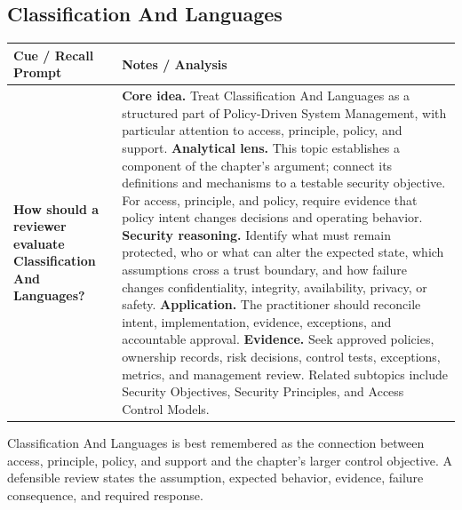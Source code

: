 \documentclass[11pt]{article}
\newcommand{\CornellHeader}{%
\rowcolor{Navy}\color{white}\bfseries Cue / Recall Prompt & \color{white}\bfseries Notes / Analysis\\\hline}
\newcommand{\CornellRow}[2]{%
\cellcolor{CueGray}\RaggedRight\textbf{#1} & \RaggedRight #2\\\hline}
\begin{document}
\subsection*{Classification And Languages}
\begin{longtable}{>{\RaggedRight\arraybackslash}p{}|>{\RaggedRight\arraybackslash}p{}}
\CornellHeader
\CornellRow{How should a reviewer evaluate Classification And Languages?}{\textbf{Core idea.} Treat Classification And Languages as a structured part of Policy-Driven System Management, with particular attention to access, principle, policy, and support. \textbf{Analytical lens.} This topic establishes a component of the chapter's argument; connect its definitions and mechanisms to a testable security objective. For access, principle, and policy, require evidence that policy intent changes decisions and operating behavior. \textbf{Security reasoning.} Identify what must remain protected, who or what can alter the expected state, which assumptions cross a trust boundary, and how failure changes confidentiality, integrity, availability, privacy, or safety. \textbf{Application.} The practitioner should reconcile intent, implementation, evidence, exceptions, and accountable approval. \textbf{Evidence.} Seek approved policies, ownership records, risk decisions, control tests, exceptions, metrics, and management review. Related subtopics include Security Objectives, Security Principles, and Access Control Models.}
\end{longtable}
\begin{topicsummary}
Classification And Languages is best remembered as the connection between access, principle, policy, and support and the chapter's larger control objective. A defensible review states the assumption, expected behavior, evidence, failure consequence, and required response.
\end{topicsummary}
\end{document}
